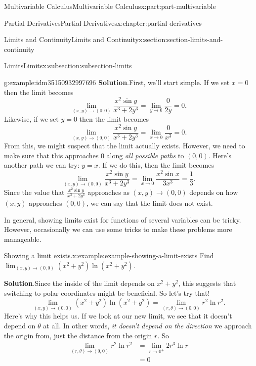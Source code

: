 \documentclass[twoside,10pt,]{book}
\newcommand{\blocktitlefont}{\relax}
\numberwithin{equation}{part}
\begin{document}
\begin{partptx}{Multivariable Calculus}{}{Multivariable Calculus}{}{}{x:part:part-multivariable}
\begin{chapterptx}{Partial Derivatives}{}{Partial Derivatives}{}{}{x:chapter:partial-derivatives}
\begin{sectionptx}{Limits and Continuity}{}{Limits and Continuity}{}{}{x:section:section-limits-and-continuity}
\begin{subsectionptx}{Limits}{}{Limits}{}{}{x:subsection:subsection-limits}
\begin{example}{}{g:example:idm35150932997696}
\noindent\textbf{\blocktitlefont Solution}.\hypertarget{g:solution:idm35150932996800}{}\quad{}First, we'll start simple. If we set \(x = 0\) then the limit becomes%
\begin{equation*}
\lim_{(x,y)\to(0,0)}\frac{x^{2}\sin y}{x^{3}+2y^{3}} = \lim_{y\to0}\frac{0}{2y} = 0.
\end{equation*}
Likewise, if we set \(y=0\) then the limit becomes%
\begin{equation*}
\lim_{(x,y)\to(0,0)}\frac{x^{2}\sin y}{x^{3}+2y^{3}} = \lim_{x\to0}\frac{0}{x^{3}} = 0.
\end{equation*}
From this, we might suspect that the limit actually exists. However, we need to make sure that this approaches \(0\) along \emph{all possible paths} to \((0,0)\). Here's another path we can try: \(y = x\). If we do this, then the limit becomes%
\begin{equation*}
\lim_{(x,y)\to(0,0)}\frac{x^{2}\sin y}{x^{3}+2y^{3}} = \lim_{x\to0}\frac{x^{2}\sin x}{3x^{3}} = \frac{1}{3}.
\end{equation*}
Since the value that \(\frac{x^{2}\sin y}{x^{3}+2y^{3}}\) approaches as \((x,y)\to(0,0)\) depends on how \((x,y)\) approaches \((0,0)\), we can say that the limit does not exist.%
\end{example}
In general, showing limits exist for functions of several variables can be tricky. However, occasionally we can use some tricks to make these problems more manageable.%
\begin{example}{Showing a limit exists.}{x:example:example-showing-a-limit-exists}%
Find \(\lim_{(x,y)\to(0,0)}(x^{2}+y^{2})\ln(x^{2}+y^{2})\).%
\par\smallskip%
\noindent\textbf{\blocktitlefont Solution}.\hypertarget{g:solution:idm35150932989760}{}\quad{}Since the inside of the limit depends on \(x^{2}+y^{2}\), this suggests that switching to polar coordinates might be beneficial. So let's try that!%
\begin{equation*}
\lim_{(x,y)\to(0,0)}(x^{2}+y^{2})\ln(x^{2}+y^{2}) = \lim_{(r,\theta)\to(0,0)}r^{2}\ln r^{2}.
\end{equation*}
Here's why this helps us. If we look at our new limit, we see that it doesn't depend on \(\theta\) at all. In other words, \emph{it doesn't depend on the direction} we approach the origin from, just the distance from the origin \(r\). So%
\begin{align*}
\lim_{(r,\theta)\to(0,0)}r^{2}\ln r^{2} & = \lim_{r\to0^{+}} 2r^{3}\ln r \\
& = 0 
\end{align*}

\end{example}
\end{subsectionptx}
\end{sectionptx}
\end{chapterptx}
\end{partptx}
\end{document}
